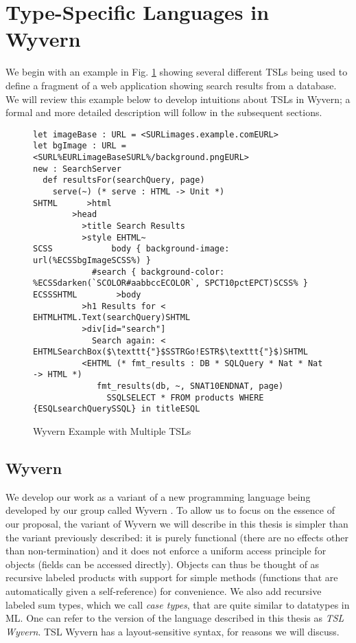 \section{Type-Specific Languages in Wyvern}
\label{s:motivation}
We begin with an example in Fig. \ref{f-example} showing several different TSLs being used to define a fragment of a web application showing search results from a database. We will review this example below to develop intuitions about TSLs in Wyvern; a formal and more detailed description will follow in the subsequent sections.

\begin{figure}[t]
\begin{lstlisting}
let imageBase : URL = <SURLimages.example.comEURL>
let bgImage : URL = <SURL%EURLimageBaseSURL%/background.pngEURL>
new : SearchServer
  def resultsFor(searchQuery, page)
    serve(~) (* serve : HTML -> Unit *)
SHTML      >html
        >head
          >title Search Results
          >style EHTML~
SCSS            body { background-image: url(%ECSSbgImageSCSS%) }
            #search { background-color: %ECSSdarken(`SCOLOR#aabbccECOLOR`, SPCT10pctEPCT)SCSS% }
ECSSSHTML        >body
          >h1 Results for < EHTMLHTML.Text(searchQuery)SHTML
          >div[id="search"]
            Search again: < EHTMLSearchBox($\texttt{"}$SSTRGo!ESTR$\texttt{"}$)SHTML
          <EHTML (* fmt_results : DB * SQLQuery * Nat * Nat -> HTML *)
             fmt_results(db, ~, SNAT10ENDNAT, page)
               SSQLSELECT * FROM products WHERE {ESQLsearchQuerySSQL} in titleESQL
\end{lstlisting}
\vspace{-8px}
\caption{Wyvern Example with Multiple TSLs}
\label{f-example}
\end{figure}
\subsection{Wyvern}
We develop our work as a variant of a new programming language being developed by our group called Wyvern \cite{Nistor:2013:WST:2489828.2489830}. To allow us to focus on the essence of our proposal, the variant of Wyvern we will describe in this thesis is simpler than the variant previously described: it is purely functional (there are no effects other than non-termination) and it does not enforce a uniform access principle for objects (fields can be accessed directly). Objects can thus be thought of as recursive labeled products with support for simple methods (functions that are automatically given a self-reference) for convenience. We also add recursive labeled sum types, which we call \emph{case types}, that are quite similar to datatypes in ML. One can refer to the version of the language described in this thesis as \emph{TSL Wyvern}. TSL Wyvern has a layout-sensitive syntax, for reasons we will discuss.

